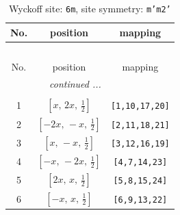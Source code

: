 \documentclass[fleqn,8pt]{jsarticle}
\begin{document}
\renewcommand{\arraystretch}{1.2}
\begin{longtable}{ccc}
\caption{Wyckoff site: {\tt 6m}, site symmetry: {\tt m'm2'}}
 \\
 \hline \hline
No. & position & mapping \\ \hline \endfirsthead

\multicolumn{2}{l}{\tablename\ \thetable{}} \\
 \hline \hline
No. & position & mapping \\ \hline \endhead

 \hline \hline
\multicolumn{2}{r}{\footnotesize\it continued ...} \\ \endfoot

 \hline \hline
\multicolumn{2}{r}{} \\ \endlastfoot

1 & $\left[ x,\, 2 x,\, \frac{1}{2} \right]$ & {\tt [1,10,17,20]} \\ \hline
2 & $\left[ - 2 x,\, - x,\, \frac{1}{2} \right]$ & {\tt [2,11,18,21]} \\ \hline
3 & $\left[ x,\, - x,\, \frac{1}{2} \right]$ & {\tt [3,12,16,19]} \\ \hline
4 & $\left[ - x,\, - 2 x,\, \frac{1}{2} \right]$ & {\tt [4,7,14,23]} \\ \hline
5 & $\left[ 2 x,\, x,\, \frac{1}{2} \right]$ & {\tt [5,8,15,24]} \\ \hline
6 & $\left[ - x,\, x,\, \frac{1}{2} \right]$ & {\tt [6,9,13,22]} \\
\end{longtable}
\renewcommand{\arraystretch}{1.2}
\end{document}
